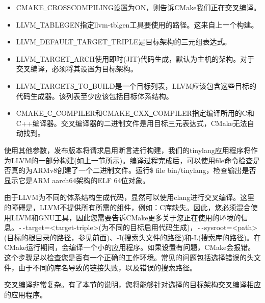 \begin{itemize}
	\item CMAKE\underline{~}CROSSCOMPILING设置为ON，则告诉CMake我们正在交叉编译。
	\item LLVM\underline{~}TABLEGEN指定llvm-tblgen工具要使用的路径。这来自上一个构建。
	\item LLVM\underline{~}DEFAULT\underline{~}TARGET\underline{~}TRIPLE是目标架构的三元组表达式。
	\item LLVM\underline{~}TARGET\underline{~}ARCH使用即时(JIT)代码生成，默认为主机的架构。对于交叉编译，必须将其设置为目标架构。
	\item LLVM\underline{~}TARGETS\underline{~}TO\underline{~}BUILD是一个目标列表，LLVM应该包含这些目标的代码生成器。该列表至少应该包括目标体系结构。
	\item CMAKE\underline{~}C\underline{~}COMPILER和CMAKE\underline{~}CXX\underline{~}COMPILER指定编译所用的C和C++编译器。交叉编译器的二进制文件是用目标三元表达式，CMake无法自动找到。
\end{itemize}

使用其他参数，发布版本将请求启用断言进行构建，我们的tinylang应用程序将作为LLVM的一部分构建(如上一节所示)。编译过程完成后，可以使用file命令检查是否真的为ARMv8创建了一个二进制文件。运行\$ file bin/tinylang，检查输出是否显示它是ARM aarch64架构的ELF 64位对象。\par

\begin{tcolorbox}[colback=blue!5!white,colframe=blue!75!black, title=使用clang进行交叉编译]
由于LLVM为不同的体系结构生成代码，显然可以使用clang进行交叉编译。这里的障碍是，LLVM不提供所有所需的组件，例如：C库缺失。因此，您必须混合使用LLVM和GNU工具，因此您需要告诉CMake更多关于您正在使用的环境的信息。\verb|--|target=<target-triple>(为不同的目标启用代码生成)，\verb|--|sysroot=<path>(目标的根目录的路径，参见前面)、-I(搜索头文件的路径)和-L(搜索库的路径)。在CMake运行期间，会编译一个小的应用程序。如果设置有问题，CMake会报错。这个步骤足以检查您是否有一个正确的工作环境。常见的问题包括选择错误的头文件，由于不同的库名导致的链接失败，以及错误的搜索路径。
\end{tcolorbox}

交叉编译非常复杂。有了本节的说明，您将能够针对选择的目标架构交叉编译相应的应用程序。\par































